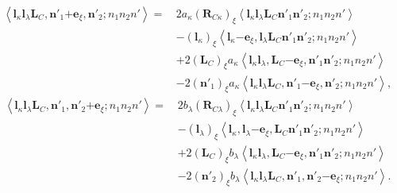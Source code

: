 \documentclass[a4paper,11pt,twoside,openright]{book}
\begin{document}
%
\begin{align}
  \left\langle\boldsymbol{l}_{\kappa}\boldsymbol{l}_{\lambda}\boldsymbol{L}_{C},%
    \boldsymbol{n}'_{1}\mathrm{+}\boldsymbol{e}_{\xi},\boldsymbol{n}'_{2};n_{1}n_{2}n'\right\rangle
  =\,&2a_{\kappa}(\boldsymbol{R}_{C\kappa})_{\xi}%
    \left\langle\boldsymbol{l}_{\kappa}\boldsymbol{l}_{\lambda}\boldsymbol{L}_{C}%
    \boldsymbol{n}'_{1}\boldsymbol{n}'_{2};n_{1}n_{2}n'\right\rangle\\
  &-(\boldsymbol{l}_{\kappa})_{\xi}%
    \left\langle\boldsymbol{l}_{\kappa}\mathrm{-}\boldsymbol{e}_{\xi},\boldsymbol{l}_{\lambda}\boldsymbol{L}_{C}%
    \boldsymbol{n}'_{1}\boldsymbol{n}'_{2};n_{1}n_{2}n'\right\rangle\nonumber\\
  &+2(\boldsymbol{L}_{C})_{\xi}a_{\kappa}%
    \left\langle\boldsymbol{l}_{\kappa}\boldsymbol{l}_{\lambda},\boldsymbol{L}_{C}\mathrm{-}\boldsymbol{e}_{\xi},%
    \boldsymbol{n}'_{1}\boldsymbol{n}'_{2};n_{1}n_{2}n'\right\rangle\nonumber\\
  &-2(\boldsymbol{n}'_{1})_{\xi}a_{\kappa}%
    \left\langle\boldsymbol{l}_{\kappa}\boldsymbol{l}_{\lambda}\boldsymbol{L}_{C},%
    \boldsymbol{n}'_{1}\mathrm{-}\boldsymbol{e}_{\xi},\boldsymbol{n}'_{2};n_{1}n_{2}n'\right\rangle,\nonumber
\end{align}
%
\begin{align}
  \left\langle\boldsymbol{l}_{\kappa}\boldsymbol{l}_{\lambda}\boldsymbol{L}_{C},%
    \boldsymbol{n}'_{1},\boldsymbol{n}'_{2}\mathrm{+}\boldsymbol{e}_{\xi};n_{1}n_{2}n'\right\rangle
  =\,&2b_{\lambda}(\boldsymbol{R}_{C\lambda})_{\xi}%
    \left\langle\boldsymbol{l}_{\kappa}\boldsymbol{l}_{\lambda}\boldsymbol{L}_{C}%
    \boldsymbol{n}'_{1}\boldsymbol{n}'_{2};n_{1}n_{2}n'\right\rangle\\
  &-(\boldsymbol{l}_{\lambda})_{\xi}%
    \left\langle\boldsymbol{l}_{\kappa},\boldsymbol{l}_{\lambda}\mathrm{-}\boldsymbol{e}_{\xi},\boldsymbol{L}_{C}%
    \boldsymbol{n}'_{1}\boldsymbol{n}'_{2};n_{1}n_{2}n'\right\rangle\nonumber\\
  &+2(\boldsymbol{L}_{C})_{\xi}b_{\lambda}%
    \left\langle\boldsymbol{l}_{\kappa}\boldsymbol{l}_{\lambda},\boldsymbol{L}_{C}\mathrm{-}\boldsymbol{e}_{\xi},%
    \boldsymbol{n}'_{1}\boldsymbol{n}'_{2};n_{1}n_{2}n'\right\rangle\nonumber\\
  &-2(\boldsymbol{n}'_{2})_{\xi}b_{\lambda}%
    \left\langle\boldsymbol{l}_{\kappa}\boldsymbol{l}_{\lambda}\boldsymbol{L}_{C},%
    \boldsymbol{n}'_{1},\boldsymbol{n}'_{2}\mathrm{-}\boldsymbol{e}_{\xi};n_{1}n_{2}n'\right\rangle.\nonumber
\end{align}
\end{document}
